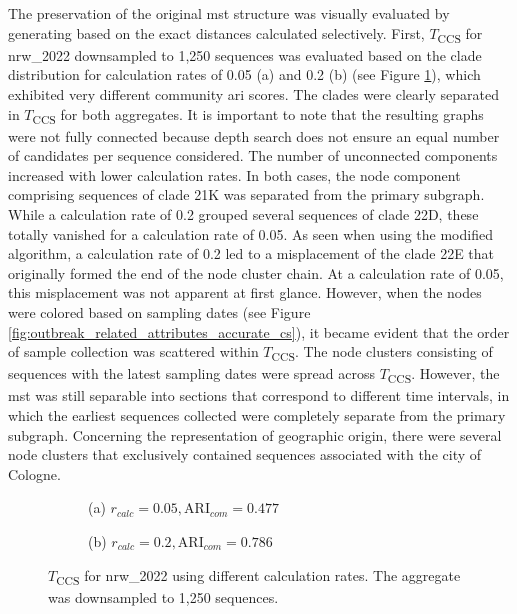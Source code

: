 The preservation of the original \acrshort{mst} structure was visually evaluated by generating  based on the exact distances calculated selectively. First, $T$\textsubscript{CCS} for nrw\_2022 downsampled to 1,250 sequences was evaluated based on the clade distribution for calculation rates of 0.05 (a) and 0.2 (b) (see Figure \ref{fig:optimization_vs_accurate_cs_mst_nrw_2022}), which exhibited very different community \acrshort{ari} scores. The clades were clearly separated in $T$\textsubscript{CCS} for both aggregates. It is important to note that the resulting graphs were not fully connected because depth search does not ensure an equal number of candidates per sequence considered. The number of unconnected components increased with lower calculation rates. In both cases, the node component comprising sequences of clade 21K was separated from the primary subgraph. While a calculation rate of 0.2 grouped several sequences of clade 22D, these totally vanished for a calculation rate of 0.05. As seen when using the modified algorithm, a calculation rate of 0.2 led to a misplacement of the clade 22E that originally formed the end of the node cluster chain. At a calculation rate of 0.05, this misplacement was not apparent at first glance. However, when the nodes were colored based on sampling dates (see Figure \ref{fig:outbreak_related_attributes_accurate_cs}), it became evident that the order of sample collection was scattered within $T$\textsubscript{CCS}. The node clusters consisting of sequences with the latest sampling dates were spread across $T$\textsubscript{CCS}. However, the \acrshort{mst} was still separable into sections that correspond to different time intervals, in which the earliest sequences collected were completely separate from the primary subgraph. Concerning the representation of geographic origin, there were several node clusters that exclusively contained sequences associated with the city of Cologne.

\begin{figure}[H]
  \centering
  \begin{subfigure}[b]{0.495\textwidth}
    
    \caption*{(a) $r_{calc}=0.05, \text{ARI}_{com}=0.477$}
  \end{subfigure}
  \hfill
  \begin{subfigure}[b]{0.495\textwidth}
    
    \caption*{(b) $r_{calc}=0.2, \text{ARI}_{com}=0.786$}
  \end{subfigure}
  \caption[$T$\textsubscript{CCS} for nrw\_2022 using different calculation rates]{$T$\textsubscript{CCS} for nrw\_2022 using different calculation rates. The aggregate was downsampled to 1,250 sequences.}
  \label{fig:optimization_vs_accurate_cs_mst_nrw_2022}
\end{figure}

